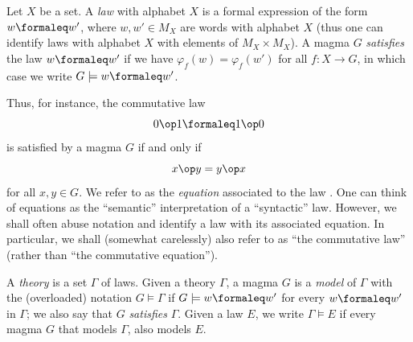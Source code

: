 \begin{definition}[Law]\label{law-def}
  \leanok
  Let $X$ be a set. A \emph{law} with alphabet $X$ is a formal expression of the form $w \formaleq w'$,
  where $w, w' \in M_X$ are words with alphabet $X$ (thus one can identify laws with alphabet $X$
  with elements of $M_X \times M_X$).
  A magma $G$ \emph{satisfies} the law $w \formaleq w'$ if
  we have $\varphi_f( w ) = \varphi_f ( w' )$ for all $f: X \to G$, in which case we write
  $G \models w \formaleq w'$.
\end{definition}

Thus, for instance, the commutative law
\begin{equation}\label{comm-law}
  0 \op 1 \formaleq 1 \op 0
\end{equation}
is satisfied by a magma $G$ if and only if
\begin{equation}\label{comm-law-2}
 x \op y = y \op x
\end{equation}
for all $x, y \in G$. We refer to  as the \emph{equation} associated to the law . One can think of equations as the ``semantic'' interpretation of a ``syntactic'' law. However, we shall often abuse notation and identify a law with its associated equation. In particular, we shall (somewhat carelessly) also refer to  as ``the commutative law'' (rather than ``the commutative equation'').

\begin{definition}[Models]\label{models-def}
  \leanok
  A \emph{theory} is a set $\Gamma$ of laws.
  Given a theory $\Gamma$, a magma $G$ is a \emph{model} of $\Gamma$ with the
  (overloaded) notation $G\models\Gamma$ if $G\models w\formaleq w'$ for every $w\formaleq w'$ in $\Gamma$; we also say that $G$ \emph{satisfies} $\Gamma$.
  Given a law $E$, we write $\Gamma \models E$ if every magma $G$ that models $\Gamma$, also models $E$.
\end{definition}

